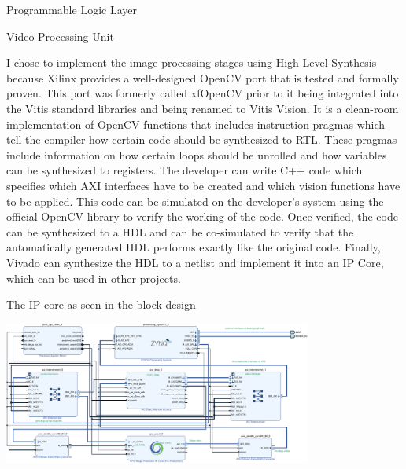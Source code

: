 \documentclass{matthijs}
\begin{document}
	\begin{hoofdstuk}{Programmable Logic Layer}

		\begin{paragraaf}{Video Processing Unit}

			I chose to implement the image processing stages using High Level Synthesis because Xilinx provides a well-designed OpenCV port that is tested and formally proven.
			This port was formerly called xfOpenCV prior to it being integrated into the Vitis standard libraries and being renamed to Vitis Vision.
			It is a clean-room implementation of OpenCV functions that includes instruction pragmas which tell the compiler how certain code should be synthesized to RTL.
			These pragmas include information on how certain loops should be unrolled and how variables can be synthesized to registers.
			The developer can write C++ code which specifies which AXI interfaces have to be created and which vision functions have to be applied.
			This code can be simulated on the developer's system using the official OpenCV library to verify the working of the code.
			Once verified, the code can be synthesized to a HDL and can be co-simulated to verify that the automatically generated HDL performs exactly like the original code.
			Finally, Vivado can synthesize the HDL to a netlist and implement it into an IP Core, which can be used in other projects.

			\vspace{1ex}
			\begin{figuur}{The IP core as seen in the block design}
				\centerline{
					\includegraphics[width=0.76\textwidth, clip, trim=6.5cm 0.16cm 6.5cm 6.9cm]{hw-block-diagram-crop-asset.pdf}
				}

				\vspace{3ex}


\end{figuur}
\end{paragraaf}
\end{hoofdstuk}
\end{document}
